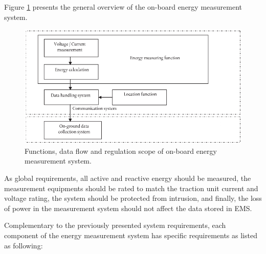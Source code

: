 Figure \ref{fig:EMS} presents the general overview of the on-board energy measurement system.

\begin{figure}[h!]
	\centering
	\includegraphics[width=\textwidth,keepaspectratio]{figures/34.SmartM/EMS}
	\caption{Functions, data flow and regulation scope of on-board energy measurement system.}
	\label{fig:EMS}
\end{figure}

As global requirements, all active and reactive energy should be measured, the measurement equipments should be rated to match the traction unit current and voltage rating, the system should be protected from intrusion, and finally, the loss of power in the  measurement system should not affect the data stored in EMS.

Complementary to the previously presented system requirements, each component of the energy measurement system has specific requirements as listed as following:

